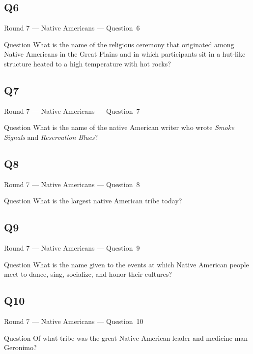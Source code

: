 \documentclass[11pt]{beamer}
\begin{document}
\subsection*{Q6}
\begin{frame}[t]{Round 7 --- Native Americans --- \mbox{Question 6}}
\vspace{-0.5em}
\begin{block}{Question}
What is the name of the religious ceremony that originated among Native Americans in the Great Plains and in which participants sit in a hut-like structure heated to a high temperature with hot rocks?
\end{block}
\end{frame}
\subsection*{Q7}
\begin{frame}[t]{Round 7 --- Native Americans --- \mbox{Question 7}}
\vspace{-0.5em}
\begin{block}{Question}
What is the name of the native American writer who wrote \emph{Smoke Signals} and \emph{Reservation Blues}?
\end{block}
\end{frame}
\subsection*{Q8}
\begin{frame}[t]{Round 7 --- Native Americans --- \mbox{Question 8}}
\vspace{-0.5em}
\begin{block}{Question}
What is the largest native American tribe today?
\end{block}
\end{frame}
\subsection*{Q9}
\begin{frame}[t]{Round 7 --- Native Americans --- \mbox{Question 9}}
\vspace{-0.5em}
\begin{block}{Question}
What is the name given to the events at which Native American people meet to dance, sing, socialize, and honor their cultures?
\end{block}
\end{frame}
\subsection*{Q10}
\begin{frame}[t]{Round 7 --- Native Americans --- \mbox{Question 10}}
\vspace{-0.5em}
\begin{block}{Question}
Of what tribe was the great Native American leader and medicine man Geronimo?
\end{block}
\end{frame}
\end{document}
